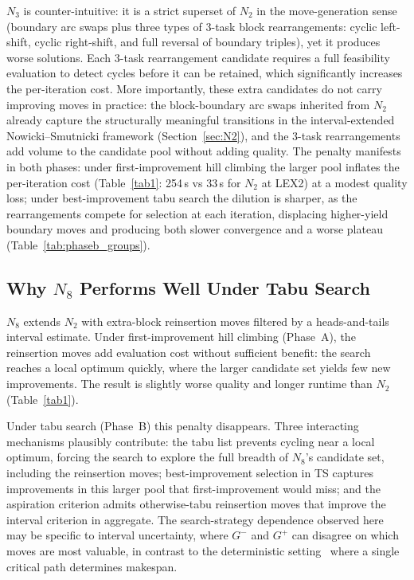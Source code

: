 \documentclass[preprint,12pt]{elsarticle}
\begin{document}
$N_3$ is counter-intuitive: it is a strict superset of $N_2$ in the move-generation sense (boundary arc swaps plus three types of 3-task block rearrangements: cyclic left-shift, cyclic right-shift, and full reversal of boundary triples), yet it produces worse solutions. Each 3-task rearrangement candidate requires a full feasibility evaluation to detect cycles before it can be retained, which significantly increases the per-iteration cost. More importantly, these extra candidates do not carry improving moves in practice: the block-boundary arc swaps inherited from $N_2$ already capture the structurally meaningful transitions in the interval-extended Nowicki--Smutnicki framework (Section~\ref{sec:N2}), and the 3-task rearrangements add volume to the candidate pool without adding quality. The penalty manifests in both phases: under first-improvement hill climbing the larger pool inflates the per-iteration cost (Table~\ref{tab1}: 254\,s vs 33\,s for $N_2$ at LEX2) at a modest quality loss; under best-improvement tabu search the dilution is sharper, as the rearrangements compete for selection at each iteration, displacing higher-yield boundary moves and producing both slower convergence and a worse plateau (Table~\ref{tab:phaseb_groups}).

\subsection{Why $N_8$ Performs Well Under Tabu Search}
\label{sec:N8-tabu}

$N_8$ extends $N_2$ with extra-block reinsertion moves filtered by a heads-and-tails interval estimate. Under first-improvement hill climbing (Phase~A), the reinsertion moves add evaluation cost without sufficient benefit: the search reaches a local optimum quickly, where the larger candidate set yields few new improvements. The result is slightly worse quality and longer runtime than $N_2$ (Table~\ref{tab1}).

Under tabu search (Phase~B) this penalty disappears. Three interacting mechanisms plausibly contribute: the tabu list prevents cycling near a local optimum, forcing the search to explore the full breadth of $N_8$'s candidate set, including the reinsertion moves; best-improvement selection in TS captures improvements in this larger pool that first-improvement would miss; and the aspiration criterion admits otherwise-tabu reinsertion moves that improve the interval criterion in aggregate. The search-strategy dependence observed here may be specific to interval uncertainty, where $G^-$ and $G^+$ can disagree on which moves are most valuable, in contrast to the deterministic setting~\cite{Xie2022} where a single critical path determines makespan.
\end{document}
